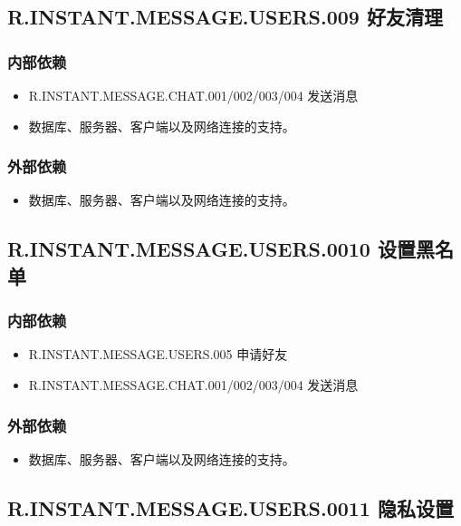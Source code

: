 {    \subsection{R.INSTANT.MESSAGE.USERS.009 好友清理}
    \subsubsection{内部依赖}
    \begin{itemize}
        \item R.INSTANT.MESSAGE.CHAT.001/002/003/004 发送消息
    \end{itemize}
    \begin{itemize}
        \item 数据库、服务器、客户端以及网络连接的支持。
    \end{itemize}
    \subsubsection{外部依赖}
    \begin{itemize}
        \item 数据库、服务器、客户端以及网络连接的支持。
    \end{itemize}

    \subsection{R.INSTANT.MESSAGE.USERS.0010 设置黑名单}
    \subsubsection{内部依赖}
    \begin{itemize}
        \item R.INSTANT.MESSAGE.USERS.005 申请好友
        \item R.INSTANT.MESSAGE.CHAT.001/002/003/004 发送消息
    \end{itemize}
    \subsubsection{外部依赖}
    \begin{itemize}
        \item 数据库、服务器、客户端以及网络连接的支持。
    \end{itemize}

    \subsection{R.INSTANT.MESSAGE.USERS.0011 隐私设置}
}
